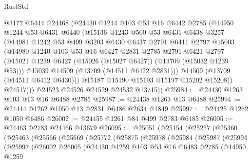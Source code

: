 \begin{lexlean}{RustStd}
\begin{coremodule}
            @3177
            @6444
            @24468
            (@24430
              @1244
              @103
              @53
              @16
              @6442
              @2785
              (@14950
                @1244
                @53
                @6431
                @6440
                (@15136
                  @1243
                  @500
                  @53
                  @6431
                  @6438
                  @3257
                  (@14981
                    @1242
                    @53
                    @499
                    @3203
                    @6430
                    @6437
                    @2791
                    @6411
                    @2797
                    @15003
                    (@14980
                      @1240
                      @103
                      @53
                      @16
                      @6427
                      @2831
                      @2785
                      @2791
                      @6421
                      @2797
                      (@15021 @1239 @6427 (@15026 (@15027 @6427)) (@13709 (@15032 @1239 @53)))
                      @15039
                      @14509
                      (@13709 (@14511 @6422 @2831)))
                    @14509
                    (@13709 (@14511 @6412 @6430)))
                  @15187
                  @15190
                  @15193
                  @15197
                  @15202
                  @15208))
              @24517)))
        @24523
        @24526
        @24529
        @24532
        @13715))
@25984 := @24430 @1263 @103 @13 @16 @6488 @2785
@25987 := @24438 @1263 @13 @6488
@25994 := @24444 @1262 @1050 @13 @2831 @6486 @2634 @1849
@25997 := @24425 @1262 @1050 @6486
@26002 := @24455 @1261 @84 @499 @2783 @6485
@26005 := @24463 @2783 @24466 @13679
@26095 := @25051
    (@25154
      (@25257
        (@25360
          (@25463
            (@25566
              (@25669
                (@25772
                  (@25875
                    (@25978
                      (@25984
                        (@25987
                          (@25994
                            (@25997
                              (@26002
                                @26005
                                (@24430
                                  @1259
                                  @103
                                  @53
                                  @16
                                  @6483
                                  @2785
                                  (@14950
                                    @1259

\end{coremodule}
\end{lexlean}
